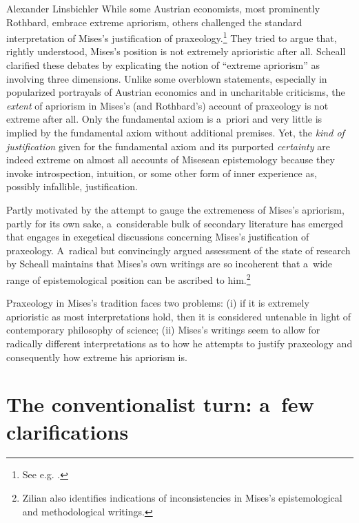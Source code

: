 \begin{artengenv}{Alexander Linsbichler}
While some Austrian economists, most prominently Rothbard, embrace extreme apriorism, others challenged the standard interpretation of Mises's justification of praxeology.\footnote{See e.g. 
\parencite[][]{zanotti_hermeneutics_2023}.%
} They tried to argue that, rightly understood, Mises's position is not extremely aprioristic after all. Scheall 
\parencite*[][]{scheall_review_2017} %
 clarified these debates by explicating the notion of ``extreme apriorism'' as involving three dimensions. Unlike some overblown statements, especially in popularized portrayals of Austrian economics and in uncharitable criticisms, the \textit{extent} of apriorism in Mises's (and Rothbard's) account of praxeology is not extreme after all. Only the fundamental axiom is a~priori and very little is implied by the fundamental axiom without additional premises. Yet, the \textit{kind of justification} given for the fundamental axiom and its purported \textit{certainty} are indeed extreme on almost all accounts of Misesean epistemology because they invoke introspection, intuition, or some other form of inner experience as, possibly infallible, justification.



Partly motivated by the attempt to gauge the extremeness of Mises's apriorism, partly for its own sake, a~considerable bulk of secondary literature has emerged that engages in exegetical discussions concerning Mises's justification of praxeology. A~radical but convincingly argued assessment of the state of research by Scheall 
\parencite*[][]{scheall_rise_2023} %
 maintains that Mises's own writings are so incoherent that a~wide range of epistemological position can be ascribed to him.\footnote{Zilian 
\parencite*[][]{zilian_klarheit_1990} %
 also identifies indications of inconsistencies in Mises's epistemological and methodological writings.}



Praxeology in Mises's tradition faces two problems: (i) if it is extremely aprioristic as most interpretations hold, then it is considered untenable in light of contemporary philosophy of science; (ii) Mises's writings seem to allow for radically different interpretations as to how he attempts to justify praxeology and consequently how extreme his apriorism is.



\section{The conventionalist turn: a~few clarifications}


\end{artengenv}
